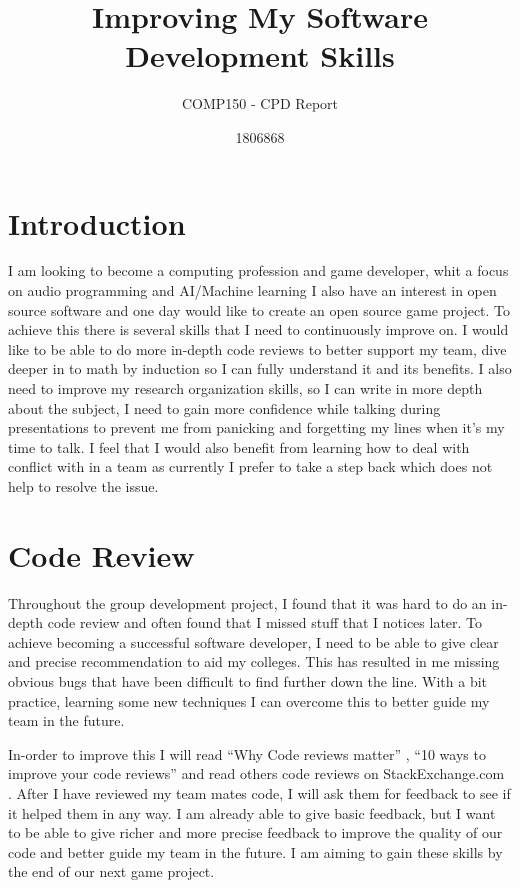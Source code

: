 \documentclass{scrartcl}
\title{Improving My Software Development Skills}
\subtitle{COMP150 - CPD Report}
\author{1806868}
\begin{document}
\maketitle

\section{Introduction}

I am looking to become a computing profession and game developer, whit a focus on audio programming and AI/Machine learning I also have an interest in open source software and one day would like to create an open source game project. To achieve this there is several skills that I need to continuously improve on. I would like to be able to do more in-depth code reviews to better support my team, dive deeper in to math by induction so I can fully understand it and its benefits. I also need to improve my research organization skills, so I can write in more depth about the subject, I need to gain more confidence while talking during presentations to prevent me from panicking and forgetting my lines when it’s my time to talk. I feel that I would also benefit from learning how to deal with conflict with in a team as currently I prefer to take a step back which does not help to resolve the issue.

\section{Code Review}

Throughout the group development project, I found that it was hard to do an in-depth code review and often found that I missed stuff that I notices later. To achieve becoming a successful software developer, I need to be able to give clear and precise recommendation to aid my colleges. This has resulted in me missing obvious bugs that have been difficult to find further down the line. With a bit practice, learning some new techniques I can overcome this to better guide my team in the future. 

In-order to improve this I will read “Why Code reviews matter” \cite{codeReviewsMatter}, “10 ways to improve your code reviews” \cite{waysToImprove} and read others code reviews on StackExchange.com \cite{stackexchange}. After I have reviewed my team mates code, I will ask them for feedback to see if it helped them in any way. I am already able to give basic feedback, but I want to be able to give richer and more precise feedback to improve the quality of our code and better guide my team in the future. I am aiming to gain these skills by the end of our next game project.
\end{document}
